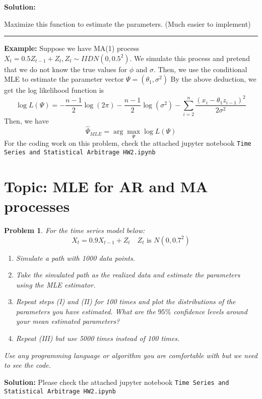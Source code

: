 \documentclass[11pt]{article}
\theoremstyle{plain} %
\newtheorem{problem}[theorem]{Problem}
\newenvironment{solution}
{\color{C2}\normalfont\begin{framed}\begingroup\textbf{Solution:} }
  {\endgroup\end{framed}}
\theoremstyle{remark}
\begin{document}
\begin{solution}
\begin{enumerate}[label = (\alph*)]
          Maximize this function to estimate the parameters. (Much easier to implement)\\

          \hrule

          \textbf{Example:} Suppose we have MA(1) process $X_t=0.5Z_{t-1}+Z_t, Z_t \sim IIDN\left(0,0.5^2\right)$. We simulate this process and pretend that we do not know the true values for $\phi$ and $\sigma$.
          Then, we use the conditional MLE to estimate the parameter vector $\Psi=\left(\theta_1, \sigma^2\right)$
          By the above deduction, we get the log likelihood function is
          $$
            \log L(\Psi)=-\frac{n-1}{2} \log (2 \pi)-\frac{n-1}{2} \log \left(\sigma^2\right)-\sum_{i=2}^n \frac{\left(x_i-\theta_1 z_{i-1}\right)^2}{2 \sigma^2}
          $$
          Then, we have
          $$
            \hat{\Psi}_{MLE}=\arg \max_{\Psi} \log L(\Psi)
          $$
          For the coding work on this problem, check the attached jupyter notebook \texttt{Time Series and Statistical Arbitrage HW2.ipynb}
  \end{enumerate}


\end{solution}

\section{Topic: MLE for AR and MA processes}
\begin{problem}
For the time series model below:
$$
  X_{t}=0.9 X_{t-1}+Z_{t} \quad Z_{t} \text{ is } N\left(0,0.7^{2}\right)
$$

\begin{enumerate}[label = (\Roman*)]
  \item Simulate a path with 1000 data points.
  \item Take the simulated path as the realized data and estimate the parameters using the MLE estimator.
  \item Repeat steps (I) and (II) for 100 times and plot the distributions of the parameters you have estimated. What are the $95 \%$ confidence levels around your mean estimated parameters?
  \item Repeat (III) but use 5000 times instead of 100 times.
\end{enumerate}

Use any programming language or algorithm you are comfortable with but we need to see the code.

\end{problem}
\begin{solution}
  Please check the attached jupyter notebook \texttt{Time Series and Statistical Arbitrage HW2.ipynb}
\end{solution}
\end{document}
